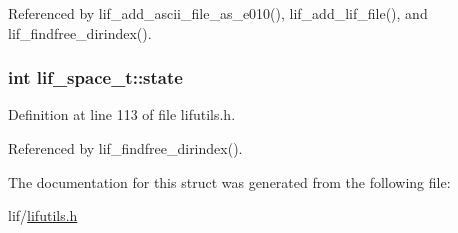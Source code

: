 Referenced by lif\+\_\+add\+\_\+ascii\+\_\+file\+\_\+as\+\_\+e010(), lif\+\_\+add\+\_\+lif\+\_\+file(), and lif\+\_\+findfree\+\_\+dirindex().

\subsubsection[{\texorpdfstring{state}{state}}]{\setlength{\rightskip}{0pt plus 5cm}int lif\+\_\+space\+\_\+t\+::state}\hypertarget{structlif__space__t_acc6b86db03a9c2b68f868bfabb350f42}{}\label{structlif__space__t_acc6b86db03a9c2b68f868bfabb350f42}


Definition at line 113 of file lifutils.\+h.



Referenced by lif\+\_\+findfree\+\_\+dirindex().



The documentation for this struct was generated from the following file\+:\begin{DoxyCompactItemize}
\item 
lif/\hyperlink{lifutils_8h}{lifutils.\+h}\end{DoxyCompactItemize}
